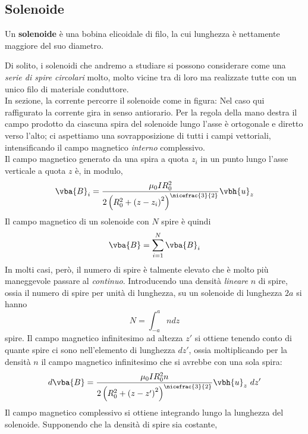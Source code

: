 \subsection{Solenoide}
\begin{define}[Solenoide]
	Un \textbf{solenoide} è una bobina elicoidale di filo, la cui lunghezza è nettamente maggiore del suo diametro.
\end{define}
Di solito, i solenoidi che andremo a studiare si possono considerare come una \textit{serie di spire circolari} molto, molto vicine tra di loro ma realizzate tutte con un unico filo di materiale conduttore.\\
In sezione, la corrente percorre il solenoide come in figura:
Nel caso qui raffigurato la corrente gira in senso antiorario. Per la regola della mano destra il campo prodotto da ciascuna spira del solenoide lungo l'asse è ortogonale e diretto verso l'alto; ci aspettiamo una sovrapposizione di tutti i campi vettoriali, intensificando il campo magnetico \textit{interno} complessivo.\\
Il campo magnetico generato da una spira a quota $z_i$ in un punto lungo l'asse verticale a quota $z$ è, in modulo,
\begin{equation*}
	\vba{B}_i=\frac{\mu_0 I R_0^2}{2\left(R_0^2+\left(z-z_i\right)^2\right)^{\nicefrac{3}{2}}}\vbh{u}_z
\end{equation*}
Il campo magnetico di un solenoide con $N$ spire è quindi
\begin{equation*}
	\vba{B}=\sum_{i=1}^{N}\vba{B}_i
\end{equation*}
In molti casi, però, il numero di spire è talmente elevato che è molto più maneggevole passare al \textit{continuo}. Introducendo una densità \textit{lineare} $n$ di spire, ossia il numero di spire per unità di lunghezza, su un solenoide di lunghezza $2a$ si hanno
\begin{equation*}
	N=\int_{-a}^{a}ndz
\end{equation*}
spire. Il campo magnetico infinitesimo ad altezza $z'$ si ottiene tenendo conto di quante spire ci sono nell'elemento di lunghezza $dz'$, ossia moltiplicando per la densità $n$ il campo magnetico infinitesimo che si avrebbe con una sola spira:
\begin{equation*}
	d\vba{B}=\frac{\mu_0 I R_0^2 n}{2\left(R_0^2+\left(z-z'\right)^2\right)^{\nicefrac{3}{2}}}\vbh{u}_z\ dz'
\end{equation*}
Il campo magnetico complessivo si ottiene integrando lungo la lunghezza del solenoide. Supponendo che la densità di spire sia costante,
